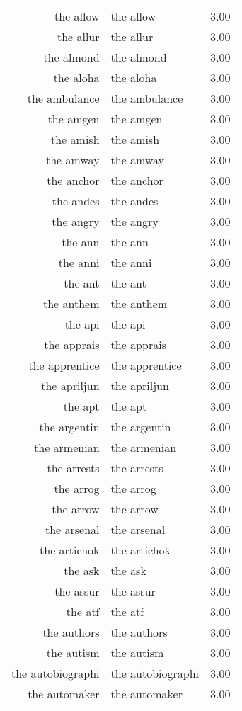 \begin{table}[ht]
\begin{tabular}{rlr}
  the allow & the allow & 3.00 \\ 
  the allur & the allur & 3.00 \\ 
  the almond & the almond & 3.00 \\ 
  the aloha & the aloha & 3.00 \\ 
  the ambulance & the ambulance & 3.00 \\ 
  the amgen & the amgen & 3.00 \\ 
  the amish & the amish & 3.00 \\ 
  the amway & the amway & 3.00 \\ 
  the anchor & the anchor & 3.00 \\ 
  the andes & the andes & 3.00 \\ 
  the angry & the angry & 3.00 \\ 
  the ann & the ann & 3.00 \\ 
  the anni & the anni & 3.00 \\ 
  the ant & the ant & 3.00 \\ 
  the anthem & the anthem & 3.00 \\ 
  the api & the api & 3.00 \\ 
  the apprais & the apprais & 3.00 \\ 
  the apprentice & the apprentice & 3.00 \\ 
  the apriljun & the apriljun & 3.00 \\ 
  the apt & the apt & 3.00 \\ 
  the argentin & the argentin & 3.00 \\ 
  the armenian & the armenian & 3.00 \\ 
  the arrests & the arrests & 3.00 \\ 
  the arrog & the arrog & 3.00 \\ 
  the arrow & the arrow & 3.00 \\ 
  the arsenal & the arsenal & 3.00 \\ 
  the artichok & the artichok & 3.00 \\ 
  the ask & the ask & 3.00 \\ 
  the assur & the assur & 3.00 \\ 
  the atf & the atf & 3.00 \\ 
  the authors & the authors & 3.00 \\ 
  the autism & the autism & 3.00 \\ 
  the autobiographi & the autobiographi & 3.00 \\ 
  the automaker & the automaker & 3.00 \\ 

\end{tabular}
\end{table}
